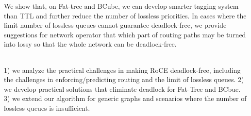  We show that, on Fat-tree and BCube, we can develop 
smarter tagging system than TTL and further reduce the number of lossless priorities.
In cases where the limit number of lossless queues cannot guarantee deadlock-free, we provide suggestions for 
network operator that which part of routing paths may be turned into lossy so that the whole network can be deadlock-free.


 \\

 1) we analyze the practical challenges in making RoCE deadlock-free, including 
the challenges in enforcing/predicting routing and the limit of lossless queues. 2) we develop practical solutions
that eliminate deadlock for Fat-Tree and BCbue. 3) we extend our algorithm for generic graphs and scenarios
where the number of lossless queues is insufficient.


